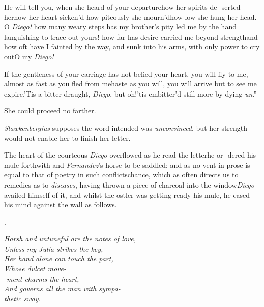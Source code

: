 \documentclass{article}
\begin{document}
\indent\lqq He will tell you, when she heard\break
\lqq of your departure\tsk how her spirits de-\break
\lqq serted her\tsk how her heart sicken’d\tsk\break
\lqq how piteously she mourn’d\tsh how low\break
\lqq she hung her head. O \textit{Diego!} how\break
\lqq many weary steps has my brother’s\break
\lqq pity led me by the hand languishing\break
\lqq to trace out yours! how far has desire\break
\lqq carried me beyond strength\tsh and how
\lqq oft have I fainted by the way, and\break
\lqq sunk into his arms, with only power\break
\lqq to cry out\tsk O my \textit{Diego!}

\indent\lqq If the gentleness of your carriage\break
\lqq has not belied your heart, you will fly\break
\lqq to me, almost as fast as you fled from\break
\lqq me\tsk haste as you will, you will arrive\break
\lqq but to see me expire.\tsk ’Tis a bitter\break
\lqq draught, \textit{Diego}, but oh!\@ ’tis embitter’d\break
\lqq still more by dying \textit{un}\tsh.”

She could proceed no farther.

\textit{Slawkenbergius} supposes the word intended was
\textit{unconvinced}, but her strength would not enable her to finish her
letter.

The heart of the courteous \textit{Diego}\break
overflowed as he read the letter\tsk he or-\break
dered his mule forthwith and
\textit{Fernandez}’s horse
to be saddled; and as no vent in
prose is equal to that of poetry in such
conflicts\tsk chance, which as often directs us to
remedies as to \textit{diseases}, having thrown a piece of charcoal
into the window\tsh \textit{Diego} availed himself of it,
and whilst the ostler was getting ready his mule, he eased his
mind against the wall as follows.

\bigskip
\centerline{.}
\parskip
\bgroup\itshape\noindent
\null\quad Harsh and untuneful are the notes of love,\\
\null\qquad Unless my Julia strikes the key,\\
\null\quad Her hand alone can touch the part,\\
\null\qquad Whose dulcet move-\\
\null\quad -\sic ment charms the heart,\\
\null\qquad And governs all the man with sympa-\\
\null\qquad\quad thetic sway.
\par\egroup
\end{document}
